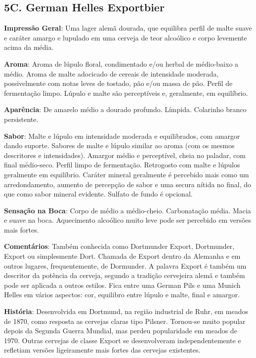 \subsection*{5C. German Helles Exportbier}
\textbf{Impressão Geral}: Uma lager alemã dourada, que equilibra perfil de malte suave e caráter amargo e lupulado em uma cerveja de teor alcoólico e corpo levemente acima da média.

\textbf{Aroma}: Aroma de lúpulo floral, condimentado e/ou herbal de médio-baixo a médio. Aroma de malte adocicado de cereais de intensidade moderada, possivelmente com notas leves de tostado, pão e/ou massa de pão. Perfil de fermentação limpo. Lúpulo e malte são perceptíveis e, geralmente, em equilíbrio.

\textbf{Aparência}: De amarelo médio a dourado profundo. Límpida. Colarinho branco persistente.

\textbf{Sabor}: Malte e lúpulo em intensidade moderada e equilibrados, com amargor dando suporte. Sabores de malte e lúpulo similar ao aroma (com os mesmos descritores e intensidades). Amargor médio e perceptível, cheia no paladar, com final médio-seco. Perfil limpo de fermentação. Retrogosto com malte e lúpulos geralmente em equilíbrio. Caráter mineral geralmente é percebido mais como um arredondamento, aumento de percepção de sabor e uma secura nítida no final, do que como sabor mineral evidente. Sulfato de fundo é opcional.

\textbf{Sensação na Boca}: Corpo de médio a médio-cheio. Carbonatação média. Macia e suave na boca. Aquecimento alcoólico muito leve pode ser percebido em versões mais fortes.

\textbf{Comentários}: Também conhecida como Dortmunder Export, Dortmunder, Export ou simplesmente Dort. Chamada de Export dentro da Alemanha e em outros lugares, frequentemente, de Dormunder. A palavra Export é também um descritor da potência da cerveja, segundo a tradição cervejeira alemã e também pode ser aplicada a outros estilos. Fica entre uma German Pils e uma Munich Helles em vários aspectos: cor, equilibro entre lúpulo e malte, final e amargor.

\textbf{História}: Desenvolvida em Dortmund, na região industrial de Ruhr, em meados de 1870, como resposta as cervejas claras tipo Pilsner. Tornou-se muito popular depois da Segunda Guerra Mundial, mas perdeu popularidade em meados de 1970. Outras cervejas de classe Export se desenvolveram independentemente e refletiam versões ligeiramente mais fortes das cervejas existentes.

